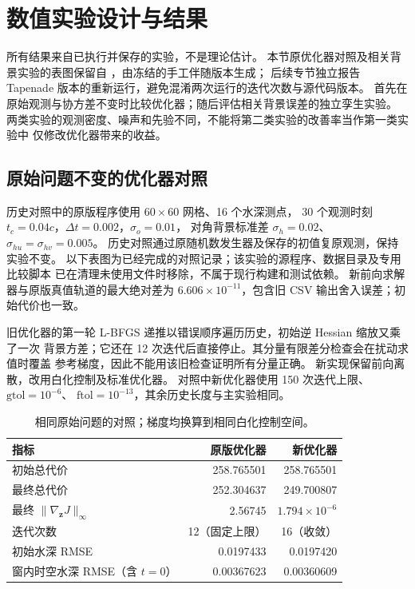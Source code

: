 \documentclass[12pt,a4paper]{article}
\begin{document}
\section{数值实验设计与结果}
\label{sec:dta-results}

所有结果来自已执行并保存的实验，不是理论估计。
本节原优化器对照及相关背景实验的表图保留自 ，由冻结的手工伴随版本生成；
后续专节独立报告 Tapenade 版本的重新运行，避免混淆两次运行的迭代次数与源代码版本。
首先在原始观测与协方差不变时比较优化器；随后评估相关背景误差的独立孪生实验。
两类实验的观测密度、噪声和先验不同，不能将第二类实验的改善率当作第一类实验中
仅修改优化器带来的收益。

\subsection{原始问题不变的优化器对照}

历史对照中的原版程序使用 $60\times60$ 网格、16 个水深测点，
30 个观测时刻 $t_c=0.04c$，$\Delta t=0.002$，$\sigma_o=0.01$，
对角背景标准差 $\sigma_h=0.02$、$\sigma_{hu}=\sigma_{hv}=0.005$。
历史对照通过原随机数发生器及保存的初值复原观测，保持实验不变。
以下表图为已经完成的对照记录；该实验的源程序、数据目录及专用比较脚本
已在清理未使用文件时移除，不属于现行构建和测试依赖。
新前向求解器与原版真值轨道的最大绝对差为 $6.606\times10^{-11}$，包含旧 CSV
输出舍入误差；初始代价也一致。

旧优化器的第一轮 L-BFGS 递推以错误顺序遍历历史，初始逆 Hessian 缩放又乘了一次
背景方差；它还在 12 次迭代后直接停止。其分量有限差分检查会在扰动求值时覆盖
参考梯度，因此不能用该旧检查证明所有分量正确。
新实现保留前向离散，改用白化控制及标准优化器。
对照中新优化器使用 150 次迭代上限、$\mathrm{gtol}=10^{-6}$、
$\mathrm{ftol}=10^{-13}$，其余历史长度与主实验相同。

\begin{table}[htbp]
\centering\small
\caption{相同原始问题的对照；梯度均换算到相同白化控制空间。}
\label{tab:dta-baseline}
\begin{tabular}{lrr}
\toprule
指标 & 原版优化器 & 新优化器\\
\midrule
初始总代价 & 258.765501 & 258.765501\\
最终总代价 & 252.304637 & 249.700807\\
最终 $\|\nabla_{\mathbf z}J\|_\infty$ & 2.56745 & $1.794\times10^{-6}$\\
迭代次数 & 12（固定上限） & 16（收敛）\\
初始水深 RMSE & 0.0197433 & 0.0197420\\
窗内时空水深 RMSE（含 $t=0$） & 0.00367623 & 0.00360609\\
\bottomrule
\end{tabular}
\end{table}
\end{document}

